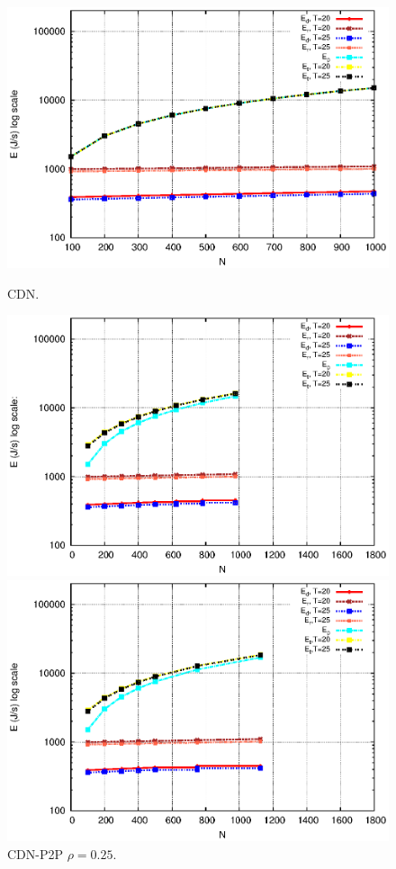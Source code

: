 \documentclass[JIP]{ipsj}
\begin{document}
\begin{figure}[ht]
\centering
\begin{minipage}[b]{0.3\linewidth}
	\includegraphics[scale=0.5]{graphs/cdn.eps}
	\caption{CDN.}
	\label{fig:4-0}
\end{minipage}
\hfill
\begin{minipage}[b]{0.3\linewidth}
	\includegraphics[scale=0.5]{graphs/cdnp2p-1.eps}
	\caption{CDN-P2P $\rho=0.25$.}
	\label{fig:4-1}
\end{minipage}
\hfill
\begin{minipage}[b]{0.3\linewidth}
	\includegraphics[scale=0.5]{graphs/cdnp2p-2.eps}

\end{minipage}
\end{figure}
\end{document}
